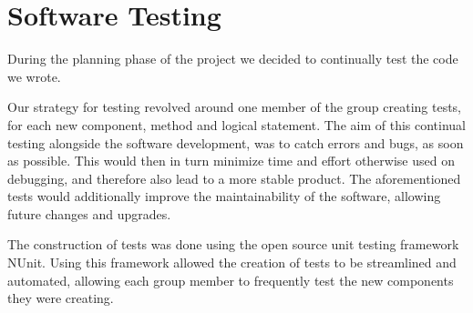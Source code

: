\section{Software Testing}
During the planning phase of the project we decided to continually test the code we wrote.

Our strategy for testing revolved around one member of the group creating tests, for each new component, method and logical statement.
The aim of this continual testing alongside the software development, was to catch errors and bugs, as soon as possible.
This would then in turn minimize time and effort otherwise used on debugging, and therefore also lead to a more stable product.
The aforementioned tests would additionally improve the maintainability of the software, allowing future changes and upgrades.

The construction of tests was done using the open source unit testing framework NUnit. 
Using this framework allowed the creation of tests to be streamlined and automated, allowing each group member to frequently test the new components they were creating.

